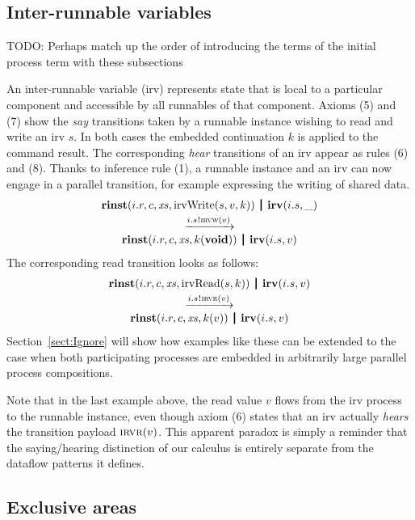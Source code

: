\documentclass[twocolumn]{article}
\begin{document}
\subsection{Inter-runnable variables}

TODO: Perhaps match up the order of introducing the terms of the initial process term  with these subsections

An inter-runnable variable (irv) represents state that is local to a particular component and accessible by all runnables of that component. Axioms (5) and (7) show the \emph{say} transitions taken by a runnable instance wishing to read and write an irv $s$. In both cases the embedded continuation $k$ is applied to the command result. The corresponding \emph{hear} transitions of an irv appear as rules (6) and (8). Thanks to inference rule (1), a runnable instance and an irv can now engage in a parallel transition, for example expressing the writing of shared data.
$$
\begin{array}{c}
  \Tpar {\Trinst {i.r} c \Xs {\TrteIrvWrite s v k}}
        {\Tirv {i.s} \_} \vspace{0.6ex} \\
  \red {\say {i.s} {\Tirvw v}} \\
  \Tpar {\Trinst {i.r} c \Xs {\Tap k \Tvoid}}
        {\Tirv {i.s} v}
\end{array}
$$
The corresponding read transition looks as follows:
$$
\begin{array}{c}
  \Tpar {\Trinst {i.r} c \Xs {\TrteIrvRead s k}}
        {\Tirv {i.s} v} \vspace{0.6ex} \\
  \red {\say {i.s} {\Tirvr v}} \\
  \Tpar {\Trinst {i.r} c \Xs {\Tap k v}}
        {\Tirv {i.s} v}
\end{array}
$$
Section~\ref{sect:Ignore} will show how examples like these can be extended to the case when both participating processes are embedded in arbitrarily large parallel process compositions.

Note that in the last example above, the read value $v$ flows from the irv process to the runnable instance, even though axiom (6) states that an irv actually \emph{hears} the transition payload $\textsc{irvr}(v)$. This apparent paradox is simply a reminder that the saying/hearing distinction of our calculus is entirely separate from the dataflow patterns it defines.


\subsection{Exclusive areas}
\end{document}
